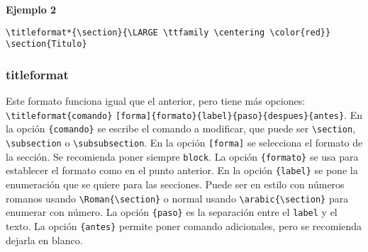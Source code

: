 	\textbf{Ejemplo 2}	
	
	\noindent
	\begin{center}
		{\LARGE {}}
	\end{center}
	
	
	\begin{myquote}
		\begin{lstlisting}
\titleformat*{\section}{\LARGE \ttfamily \centering \color{red}}
\section{Titulo}
		\end{lstlisting}
	\end{myquote} 
	
	\subsubsection{titleformat}
	
	Este formato funciona igual que el anterior, pero tiene más opciones: \verb|\titleformat{comando}| \verb|[forma]{formato}{label}{paso}{despues}{antes}|. En la opción \verb|{comando}| se escribe el comando a modificar, que puede ser \verb|\section|, \verb|\subsection| o \verb|\subsubsection|. En la opción \verb|[forma]| se selecciona el formato de la sección. Se recomienda poner siempre \verb|block|. La opción \verb|{formato}| se usa para establecer el formato como en el punto anterior. En la opción \verb|{label}| se pone la enumeración que se quiere para las secciones. Puede ser en estilo con números romanos usando \verb|\Roman{\section}| o normal usando \verb|\arabic{\section}| para enumerar con número. La opción \verb|{paso}| es la separación entre el \verb|label| y el texto. La opción \verb|{antes}| permite poner comando adicionales, pero se recomienda dejarla en blanco.
	
